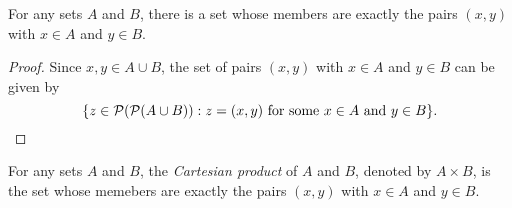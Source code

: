 \begin{theorem}
  For any sets $A$ and $B$, there is a set whose members are exactly the
  pairs $(x, y)$ with $x \in A$ and $y \in B$.
\end{theorem}
\begin{proof}
  Since $x, y \in A \cup B$, the set of pairs $(x, y)$ with $x \in A$ and
  $y \in B$ can be given by
  \begin{equation*}
    \{z \in \mathcal{P}(\mathcal{P}(A \cup B)):
    \text{$z = (x, y)$ for some $x \in A$ and $y \in B$}\}.
    \qedhere
  \end{equation*}
\end{proof}

\begin{definition}
  For any sets $A$ and $B$, the \emph{Cartesian product} of $A$ and $B$,
  denoted by $A \times B$, is the set whose memebers are exactly the pairs
  $(x, y)$ with $x \in A$ and $y \in B$.
\end{definition}